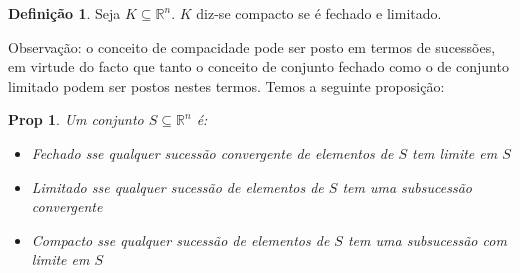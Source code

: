 \documentclass{article}
\newcommand{\R}{\mathbb{R}}
\newtheorem{prop}{Prop}
\theoremstyle{definition}
\newtheorem*{definition*}{Definição}
\begin{document}
	\begin{definition*}
	Seja $K \subseteq \R^n$. $K$ diz-se compacto se é fechado e limitado.
	\end{definition*}
	
	Observação: o conceito de compacidade pode ser posto em termos de sucessões, em virtude do facto que tanto o conceito de conjunto fechado como o de conjunto limitado podem ser postos nestes termos. Temos a seguinte proposição:
	
	\begin{prop}
	Um conjunto $S \subseteq \R^n$ é:
	
	\begin{itemize}
	\item Fechado sse qualquer sucessão convergente de elementos de $S$ tem limite em $S$
	
	\item Limitado sse qualquer sucessão de elementos de $S$ tem uma subsucessão convergente
	
	\item Compacto sse qualquer sucessão de elementos de $S$ tem uma subsucessão com limite em $S$
	\end{itemize}
	\end{prop}
	
\end{document}
